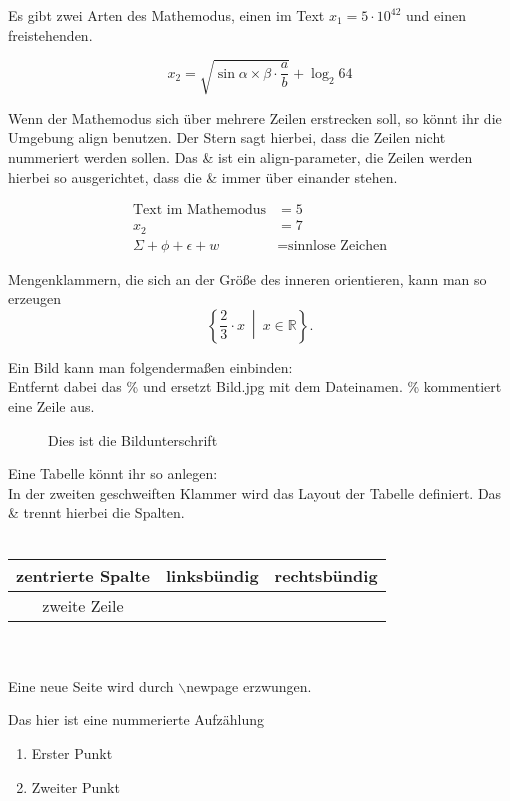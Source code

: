 \documentclass[a4paper]{scrartcl}
\begin{document}
Es gibt zwei Arten des Mathemodus, einen im Text $x_1 = 5 \cdot 10^{42}$ und einen 
freistehenden.

\[x_2 = \sqrt{ \sin{ \alpha \times \beta} \cdot \frac{a}{b}} + \log_2{64}\]

Wenn der Mathemodus sich über mehrere Zeilen erstrecken soll, so könnt ihr die 
Umgebung align benutzen. Der Stern sagt hierbei, dass die Zeilen nicht nummeriert 
werden sollen. Das \& ist ein align-parameter, die Zeilen werden hierbei so ausgerichtet, 
dass die \& immer über einander stehen.

\begin{align*}
\text{Text im Mathemodus} & = 5\\
x_2 &= 7\\
\Sigma + \phi + \epsilon + w &= \text{sinnlose Zeichen}
\end{align*}

Mengenklammern, die sich an der Größe des inneren orientieren, kann man so erzeugen
\[\left\{ \frac{2}{3} \cdot x \ \middle| \ x \in \mathbb{R} \right\} .\]


Ein Bild kann man folgendermaßen einbinden: \\
Entfernt dabei das \% und ersetzt Bild.jpg mit dem Dateinamen. \% kommentiert 
eine Zeile aus.

\begin{figure}[H]
\centering
\caption{Dies ist die Bildunterschrift}
\end{figure}

Eine Tabelle könnt ihr so anlegen:\\
In der zweiten geschweiften Klammer wird das Layout der Tabelle definiert. 
Das \& trennt hierbei die Spalten.\\
\ \\ %
\begin{tabular}{c|lr}
  zentrierte Spalte & linksbündig & rechtsbündig\\
  \hline
  zweite Zeile & \\
\end{tabular}\\
\ \\
Eine neue Seite wird durch $\backslash$newpage erzwungen.
\newpage

Das hier ist eine nummerierte Aufzählung
\begin{enumerate}
\item Erster Punkt
\item Zweiter Punkt
\end{enumerate}
\end{document}
